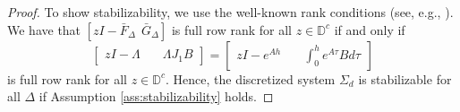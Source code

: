 \documentclass[letterpaper, 12pt, draftcls, onecolumn]{ieeeconf}
\begin{document}
\begin{proof}
	To show stabilizability, we use
	the well-known rank conditions (see, e.g., \cite[Sec.~3.2]{zhou1996}).
	We have that $[zI - \bar{F}_{\Delta}~~  \bar{G}_{\Delta}]$
is full row rank for all $z \in \mathbb{D}^c$ if and only if
	\begin{equation*}
	\begin{bmatrix}
	zI - \Lambda  &\quad \Lambda J_1B
	\end{bmatrix}		
	=
	\begin{bmatrix}
	zI - e^{Ah}  &\quad \int^{h}_0 e^{A\tau} B d\tau 
	\end{bmatrix}		
	\end{equation*}
	is full row rank for all $z \in \mathbb{D}^c$.
	Hence, the discretized system $\Sigma_d$ is stabilizable for all $\Delta$ if 
	Assumption \ref{ass:stabilizability} holds.
\end{proof}
\end{document}
